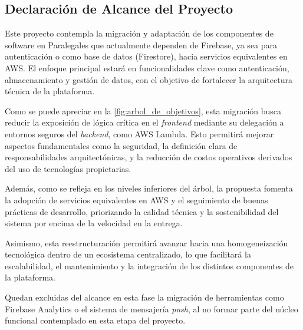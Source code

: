 \subsection{Declaración de Alcance del Proyecto}

Este proyecto contempla la migración y adaptación de los componentes de software en Paralegales que actualmente dependen de Firebase, ya sea para autenticación o como base de datos (Firestore), hacia servicios equivalentes en AWS. El enfoque principal estará en funcionalidades clave como autenticación, almacenamiento y gestión de datos, con el objetivo de fortalecer la arquitectura técnica de la plataforma.

Como se puede apreciar en la \autoref{fig:arbol_de_objetivos}, esta migración busca reducir la exposición de lógica crítica en el \textit{frontend} mediante su delegación a entornos seguros del \textit{backend}, como AWS Lambda. Esto permitirá mejorar aspectos fundamentales como la seguridad, la definición clara de responsabilidades arquitectónicas, y la reducción de costos operativos derivados del uso de tecnologías propietarias.

Además, como se refleja en los niveles inferiores del árbol, la propuesta fomenta la adopción de servicios equivalentes en AWS y el seguimiento de buenas prácticas de desarrollo, priorizando la calidad técnica y la sostenibilidad del sistema por encima de la velocidad en la entrega.

Asimismo, esta reestructuración permitirá avanzar hacia una homogeneización tecnológica dentro de un ecosistema centralizado, lo que facilitará la escalabilidad, el mantenimiento y la integración de los distintos componentes de la plataforma.

Quedan excluidas del alcance en esta fase la migración de herramientas como Firebase Analytics o el sistema de mensajería \textit{push}, al no formar parte del núcleo funcional contemplado en esta etapa del proyecto.

